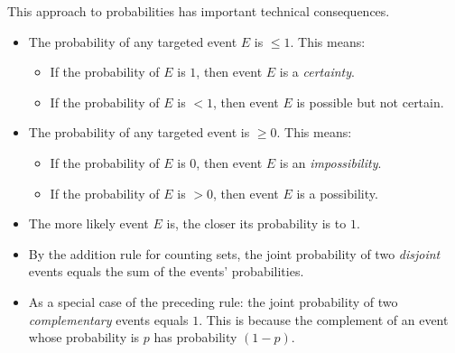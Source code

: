 \noindent
This approach to probabilities has important technical consequences.
  \begin{itemize}
  \item
The probability of any targeted event $E$ is $\leq 1$.  This means:
    \begin{itemize}
    \item
If the probability of $E$ is $1$, then event $E$ is a {\em certainty}.
    \item
If the probability of $E$ is $< 1$, then event $E$ is possible but not certain.
   \end{itemize}

 \item
The probability of any targeted event is $\geq 0$.   This means:
    \begin{itemize}
    \item
If the probability of $E$ is $0$, then event $E$ is an {\em impossibility}.
    \item
If the probability of $E$ is $> 0$, then event $E$ is a possibility.
   \end{itemize}

  \item
The more likely event $E$ is, the closer its probability is to $1$.
  \item
By the addition rule for counting sets, the joint probability of two {\em disjoint} events equals the sum of the events' probabilities.
  \item
As a special case of the preceding rule: the joint probability of two {\em complementary} events
equals $1$.  This is because the complement of an event whose probability is $p$ has
probability  $(1-p)$.
  \end{itemize}

\bigskip

\noindent {}

